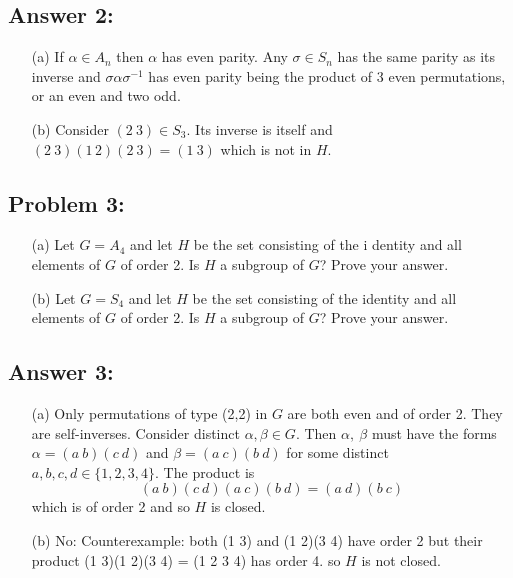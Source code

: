 \documentclass[%
  10pt,
  letterpaper
]{article}
\begin{document}
\subsection*{Answer 2:}

\begin{enumerate}
\item[(a)] If \(\alpha \in A_n\) then \(\alpha\) has even parity. Any \(\sigma\in S_n\)
  has the same parity as its inverse and \(\sigma\alpha\sigma^{-1}\) has even parity
  being the product of 3 even permutations, or an even and two odd.
\item[(b)] Consider \((2\ 3)\in S_3\). Its inverse is itself and \((2\ 3)(1\,2)(2\ 3)=(1\ 3)\)
  which is not in \(H\).
    \end{enumerate}



\newpage
\subsection*{Problem 3: }
\begin{enumerate}
\item[(a)] Let \( G = A_4 \) and let \( H \) be the set consisting of the i
  dentity and all elements of \( G \) of order 2. Is \( H \) a subgroup of \( G \)?
  Prove your answer.
\item[(b)] Let \( G = S_4 \) and let \( H \) be the set consisting of the identity
  and all elements of \( G \) of order 2. Is \( H \) a subgroup of \( G \)?
  Prove your answer.
\end{enumerate}


\subsection*{Answer 3:}
\begin{enumerate}
\item[(a)] Only permutations of type (2,2) in \(G\) are both even and of order 2.
  They are self-inverses. Consider distinct \(\alpha, \beta \in G\).
  Then \(\alpha,\ \beta\)
  must have the forms \(\alpha=(a\ b)(c\ d)\) and \(\beta=(a\ c)(b\ d)\) for
  some distinct \(a, b, c, d\in \{1,2,3,4\}\). The product
  is \[(a\ b)(c\ d)(a\ c)(b\ d)=(a\ d)(b\ c)\] which is of order 2 and so \(H\) is closed.
\item[(b)] No: Counterexample: both (1 3) and (1 2)(3 4) have order 2 but their product
  (1 3)(1 2)(3 4) = (1 2 3 4) has
  order 4. so \(H\) is not closed.
\end{enumerate}
\end{document}
